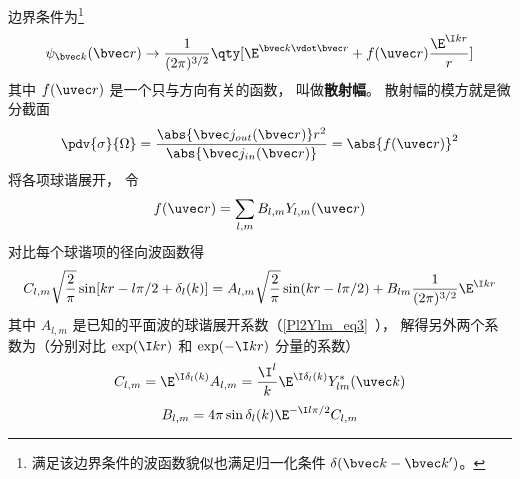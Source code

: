 边界条件为\footnote{满足该边界条件的波函数貌似也满足归一化条件 $\delta(\bvec k - \bvec k')$。}
\begin{equation}
\psi_{\bvec k}(\bvec r) \to \frac{1}{(2\pi)^{3/2}} \qty[\E^{\bvec k \vdot \bvec r} + f(\uvec r) \frac{\E^{\I kr}}{r}]
\end{equation}
其中 $f(\uvec r)$ 是一个只与方向有关的函数， 叫做\textbf{散射幅}。 散射幅的模方就是微分截面
\begin{equation}
\pdv{\sigma}{\Omega} = \frac{\abs{\bvec j_{out}(\bvec r)}r^2}{\abs{\bvec j_{in}(\bvec r)}}
= \abs{f(\uvec r)}^2
\end{equation}
将各项球谐展开， 令
\begin{equation}
f(\uvec r) = \sum_{l, m} B_{l,m} Y_{l,m}(\uvec r)
\end{equation}
对比每个球谐项的径向波函数得
\begin{equation}
C_{l,m} \sqrt{\frac{2}{\pi}} \sin[kr -l\pi/2 + \delta_l(k)] = A_{l,m}  \sqrt{\frac{2}{\pi}} \sin(kr - l \pi/2) + B_{lm} \frac{1}{(2\pi)^{3/2}} \E^{\I kr}
\end{equation}
其中 $A_{l,m}$ 是已知的平面波的球谐展开系数（\autoref{Pl2Ylm_eq3}~）， 解得另外两个系数为（分别对比 $\exp(\I kr)$ 和 $\exp(-\I kr)$ 分量的系数）
\begin{equation}
C_{l,m} = \E^{\I\delta_l(k)} A_{l, m} = \frac{\I^l}{k} \E^{\I\delta_l(k)} Y_{lm}^*(\uvec k)
\end{equation}
\begin{equation}
B_{l,m} =4\pi \sin\delta_l(k) \E^{-\I l\pi/2} C_{l,m}
\end{equation}
